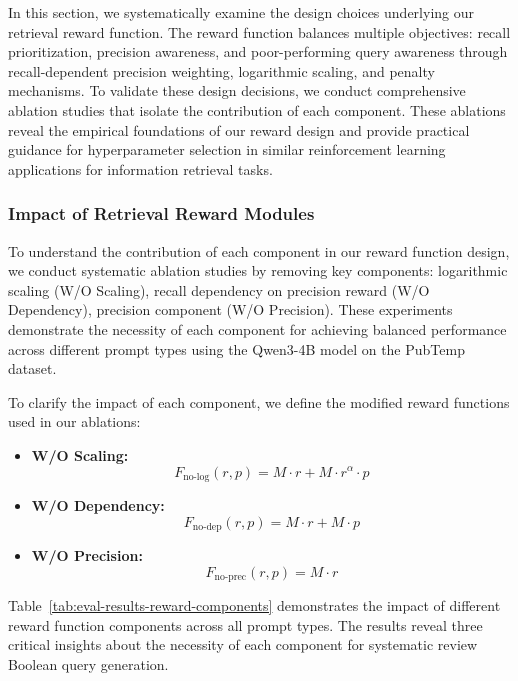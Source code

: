 In this section, we systematically examine the design choices underlying our retrieval reward function. The reward function balances multiple objectives: recall prioritization, precision awareness, and poor-performing query awareness through recall-dependent precision weighting, logarithmic scaling, and penalty mechanisms. To validate these design decisions, we conduct comprehensive ablation studies that isolate the contribution of each component. These ablations reveal the empirical foundations of our reward design and provide practical guidance for hyperparameter selection in similar reinforcement learning applications for information retrieval tasks.

\subsubsection{Impact of Retrieval Reward Modules}


To understand the contribution of each component in our reward function design, we conduct systematic ablation studies by removing key components: logarithmic scaling (W/O Scaling), recall dependency on precision reward (W/O Dependency), precision component (W/O Precision). These experiments demonstrate the necessity of each component for achieving balanced performance across different prompt types using the Qwen3-4B model on the PubTemp dataset.

To clarify the impact of each component, we define the modified reward functions used in our ablations:
\begin{itemize}
	\item \textbf{W/O Scaling:}
	\[
	F_{\text{no-log}}(r, p) = M \cdot r + M \cdot r^\alpha \cdot p
	\]
	\item \textbf{W/O Dependency:}
	\[
	F_{\text{no-dep}}(r, p) = M \cdot r + M \cdot p
	\]
	\item \textbf{W/O Precision:}
	\[
	F_{\text{no-prec}}(r, p) = M \cdot r
	\]
\end{itemize}

Table~\ref{tab:eval-results-reward-components} demonstrates the impact of different reward function components across all prompt types. The results reveal three critical insights about the necessity of each component for systematic review Boolean query generation.

